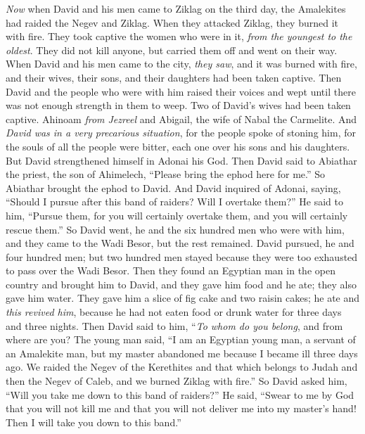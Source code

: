 \begin{biblechapter} %
 \textit{Now} when David and his men came to Ziklag on the third day, the Amalekites had raided the Negev and Ziklag. When they attacked Ziklag, they burned it with fire.
\verse They took captive the women who were in it, \textit{from the youngest to the oldest}. They did not kill anyone, but carried them off and went on their way.
\verse When David and his men came to the city, \textit{they saw}, and it was burned with fire, and their wives, their sons, and their daughters had been taken captive.
\verse Then David and the people who were with him raised their voices and wept until there was not enough strength in them to weep.
\verse Two of David’s wives had been taken captive. Ahinoam \textit{from Jezreel} and Abigail, the wife of Nabal the Carmelite.
\verse And \textit{David was in a very precarious situation}, for the people spoke of stoning him, for the souls of all the people were bitter, each one over his sons and his daughters. But David strengthened himself in Adonai his God.
\verse Then David said to Abiathar the priest, the son of Ahimelech, “Please bring the ephod here for me.” So Abiathar brought the ephod to David.
\verse And David inquired of Adonai, saying, “Should I pursue after this band of raiders? Will I overtake them?” He said to him, “Pursue them, for you will certainly overtake them, and you will certainly rescue them.”
\verse So David went, he and the six hundred men who were with him, and they came to the Wadi Besor, but the rest remained.
\verse David pursued, he and four hundred men; but two hundred men stayed because they were too exhausted to pass over the Wadi Besor.
\verse Then they found an Egyptian man in the open country and brought him to David, and they gave him food and he ate; they also gave him water.
\verse They gave him a slice of fig cake and two raisin cakes; he ate and \textit{this revived him}, because he had not eaten food or drunk water for three days and three nights.
\verse Then David said to him, “\textit{To whom do you belong}, and from where are you? The young man said, “I am an Egyptian young man, a servant of an Amalekite man, but my master abandoned me because I became ill three days ago.
\verse We raided the Negev of the Kerethites and that which belongs to Judah and then the Negev of Caleb, and we burned Ziklag with fire.”
\verse So David asked him, “Will you take me down to this band of raiders?” He said, “Swear to me by God that you will not kill me and that you will not deliver me into my master’s hand! Then I will take you down to this band.”

\end{biblechapter}
